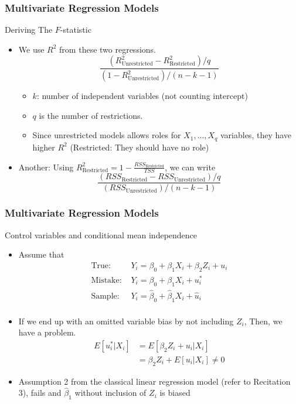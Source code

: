 \documentclass[compress]{beamer}
\begin{document}
\begin{frame}
\frametitle{Multivariate Regression Models}
Deriving The $F$-statistic
\begin{itemize}
 \item We use $R^2$ from these two regressions. 
\[
\frac{(R^2_{\text{Unrestricted}}-R^2_{\text{Restricted}})/q}{(1-R^2_{\text{Unrestricted}})/(n-k-1)}
\]
\begin{itemize}
\item $k$: number of independent variables (not counting intercept)
\item $q$ is the number of restrictions. 
\item Since unrestricted models allows roles for $X_1,...,X_q$ variables, they have higher $R^2$ (Restricted: They should have no role)
\end{itemize}
\item Another: Using $R^2_{\text{Restricted}} = 1-\frac{RSS_{\text{Restricted}}}{TSS}$, we can write
\[
\frac{(RSS_{\text{Restricted}}-RSS_{\text{Unrestricted}})/q}{(RSS_{\text{Unrestricted}})/(n-k-1)}
\] 
\end{itemize}
\end{frame}

\begin{frame}
\frametitle{Multivariate Regression Models}
Control variables and conditional mean independence
\begin{itemize}
 \item Assume that 
 \[
\begin{aligned}
\text{True: }& Y_i = \beta_0 + \beta_1 X_i + \beta_2 Z_i+u_i\\
\text{Mistake: }& Y_i = \beta_0 + \beta_1 X_i + u_i^*\\
\text{Sample: }& Y_i = \hat{\beta}_0 + \hat{\beta}_1 X_i+ \hat{u}_i\\
\end{aligned}
\]
\item If we end up with an omitted variable bias by not including $Z_i$, Then, we have a problem. 
\[
\begin{aligned}
E[u_i^*|X_i]&=E[\beta_2Z_i+u_i|X_i]\\
&=\beta_2Z_i+E[u_i|X_i] \neq 0
\end{aligned}
\]
\item Assumption 2 from the classical linear regression model (refer to Recitation 3), fails and $\hat{\beta}_1$ without inclusion of $Z_i$ is biased
\end{itemize}
\end{frame}
\end{document}
